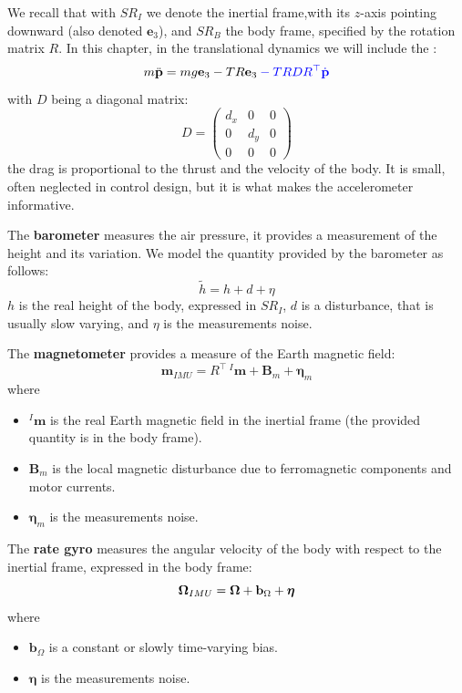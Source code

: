 \documentclass[10pt, a4paper]{report}
\begin{document}
We recall that with $SR_I$ we denote the inertial frame,with its $z$-axis pointing downward (also denoted $\mathbf e_3$), and $SR_B$ the body frame, specified by the rotation matrix $R$. In this chapter, in the translational dynamics we will include the :\begin{equation}
    m\ddot{\mathbf p}=mg\mathbf e_3-TR\mathbf e_3\color{blue}-TRDR^\top\dot{\mathbf p}\color{black}
\end{equation}
with $D$ being a diagonal matrix:\begin{equation}
    D=\begin{pmatrix}
        d_x&0&0\\
        0&d_y&0\\
        0&0&0
    \end{pmatrix}
\end{equation}
the drag is proportional to the thrust and the velocity of the body. It is small, often neglected in control design, but it is what makes the
accelerometer informative.\bigskip

\noindent The \textbf{barometer} measures the air pressure, it provides a measurement of the height and its variation. We model the quantity provided by the barometer as follows:\begin{equation}
    \tilde h = h +d+\eta 
\end{equation}
$h$ is the real height of the body, expressed in $SR_I$, $d$ is a disturbance, that is usually slow varying, and $\eta$ is the measurements noise.\bigskip

\noindent The \textbf{magnetometer} provides a measure of the Earth magnetic field:\begin{equation}
    \mathbf m_{IMU} = R^\top\,{}^I\mathbf m+\mathbf B_m+\boldsymbol{\eta}_m 
\end{equation}
where\begin{itemize}
    \item ${}^I\mathbf m$ is the real Earth magnetic field in the inertial frame (the provided quantity is in the body frame).
    \item $\mathbf B_m$ is the local magnetic disturbance due to ferromagnetic components and motor currents.
    \item $\boldsymbol\eta_m$ is the measurements noise.
\end{itemize}

\noindent The \textbf{rate gyro} measures the angular velocity of the body with respect to the inertial frame, expressed in the body frame:\begin{equation}
    {\boldsymbol{\Omega}}_{IMU}={\boldsymbol{\Omega}}+\mathbf b_\Omega+\boldsymbol{\eta}
\end{equation}where\begin{itemize}
    \item $\mathbf b_\Omega$ is a constant or slowly time-varying bias.
    \item $\boldsymbol\eta$ is the measurements noise.
\end{itemize}
\end{document}
